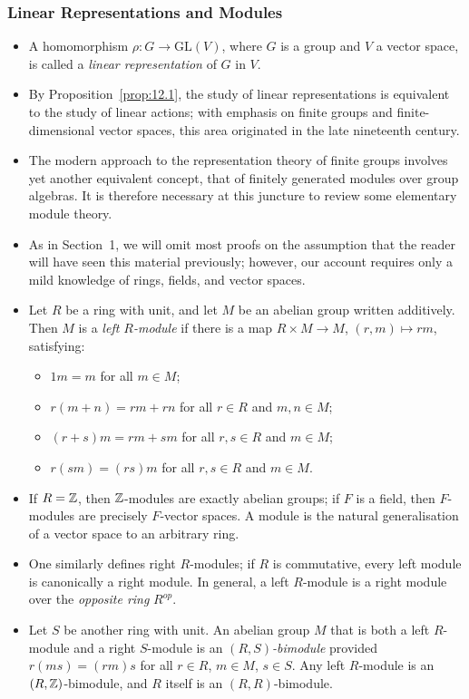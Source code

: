 \documentclass[../Odyssey_Project.tex]{subfiles}
\begin{document}
\subsubsection*{Linear Representations and Modules}
\begin{itemize}
    \item A homomorphism $\rho \colon G \to \mathrm{GL}(V)$, where $G$ is a group and $V$ a vector space, is called a \emph{linear representation} of $G$ in $V$.
    \item By Proposition~\ref{prop:12.1}, the study of linear representations is equivalent to the study of linear actions; with emphasis on finite groups and finite-dimensional vector spaces, this area originated in the late nineteenth century.
    \item The modern approach to the representation theory of finite groups involves yet another equivalent concept, that of finitely generated modules over group algebras. It is therefore necessary at this juncture to review some elementary module theory.
    \item As in Section~1, we will omit most proofs on the assumption that the reader will have seen this material previously; however, our account requires only a mild knowledge of rings, fields, and vector spaces.
    \item Let $R$ be a ring with unit, and let $M$ be an abelian group written additively. Then $M$ is a \emph{left $R$-module} if there is a map $R \times M \to M$, $(r,m) \mapsto rm$, satisfying:
    \begin{itemize}
        \item $1m = m$ for all $m \in M$;
        \item $r(m + n) = rm + rn$ for all $r \in R$ and $m, n \in M$;
        \item $(r + s)m = rm + sm$ for all $r, s \in R$ and $m \in M$;
        \item $r(sm) = (rs)m$ for all $r, s \in R$ and $m \in M$.
    \end{itemize}
    \item If $R = \mathbb{Z}$, then $\mathbb{Z}$-modules are exactly abelian groups; if $F$ is a field, then $F$-modules are precisely $F$-vector spaces. A module is the natural generalisation of a vector space to an arbitrary ring.
    \item One similarly defines right $R$-modules; if $R$ is commutative, every left module is canonically a right module. In general, a left $R$-module is a right module over the \emph{opposite ring} $R^{op}$.
    \item Let $S$ be another ring with unit. An abelian group $M$ that is both a left $R$-module and a right $S$-module is an \emph{$(R,S)$-bimodule} provided $r(ms) = (rm)s$ for all $r \in R$, $m \in M$, $s \in S$. Any left $R$-module is an $(R,\mathbb{Z})$-bimodule, and $R$ itself is an $(R,R)$-bimodule.

\end{itemize}
\end{document}
